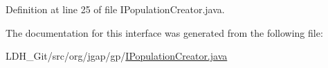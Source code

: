 Definition at line 25 of file I\-Population\-Creator.\-java.



The documentation for this interface was generated from the following file\-:\begin{DoxyCompactItemize}
\item 
L\-D\-H\-\_\-\-Git/src/org/jgap/gp/\hyperlink{_i_population_creator_8java}{I\-Population\-Creator.\-java}\end{DoxyCompactItemize}
